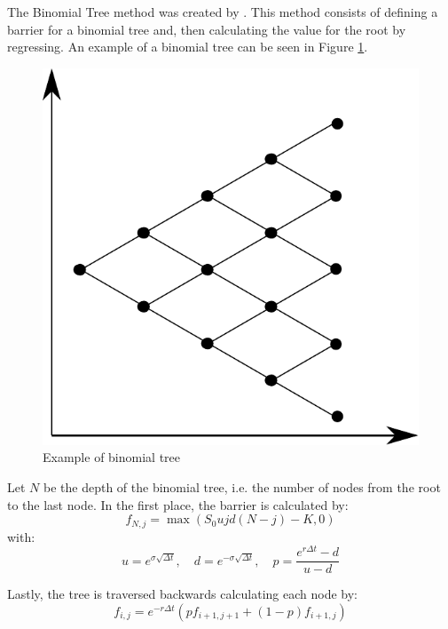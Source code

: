 \documentclass[11pt]{article}
\theoremstyle{definition}
\theoremstyle{remark}
\theoremstyle{remark}
\newcommand{\expp}[1]{e^{#1}}
\begin{document}
The Binomial Tree method was created by \textcite{cox1979}. This method consists
of defining a barrier for a binomial tree and, then calculating the value for
the root by regressing. An example of a binomial tree can be seen in Figure
\ref{fig:btex}.

\begin{figure}[ht]
  \centering
  \includegraphics[scale=.5]{../plts/binomial-tree-example}
  \caption{Example of binomial tree}
  \label{fig:btex}
\end{figure}

Let $N$ be the depth of the binomial tree, i.e. the number of nodes from the
root to the last node. In the first place, the barrier is calculated by:
\begin{equation*}
  f_{N, j} = \max(S_{0}ujd(N - j) - K, 0)
\end{equation*}
with:
\begin{equation*}
  u = \expp{\sigma \sqrt{\Delta t}}, \quad d = \expp{-\sigma \sqrt{\Delta t}}, \quad
  p = \frac{\expp{r \Delta t} - d}{u - d}
\end{equation*}

Lastly, the tree is traversed backwards calculating each node by:
\begin{equation*}
  f_{i, j} = \expp{-r \Delta t} (p f_{i + 1, j+1} + (1 - p)  f_{i+1, j})
\end{equation*}
\end{document}
